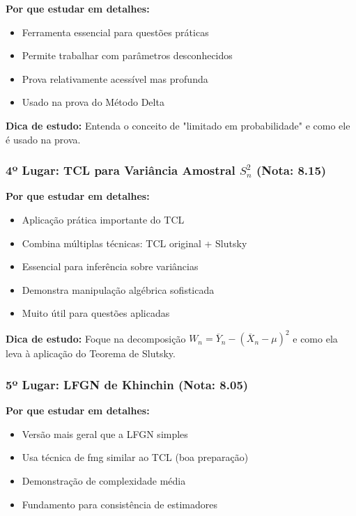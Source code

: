 \documentclass[12pt,a4paper]{article}
\theoremstyle{plain}
\theoremstyle{definition}
\theoremstyle{remark}
\begin{document}
\textbf{Por que estudar em detalhes:}
\begin{itemize}
    \item Ferramenta essencial para questões práticas
    \item Permite trabalhar com parâmetros desconhecidos
    \item Prova relativamente acessível mas profunda
    \item Usado na prova do Método Delta
\end{itemize}

\textbf{Dica de estudo:} Entenda o conceito de "limitado em probabilidade" e como ele é usado na prova.

\subsubsection{4º Lugar: TCL para Variância Amostral $S_n^2$ (Nota: 8.15)}

\textbf{Por que estudar em detalhes:}
\begin{itemize}
    \item Aplicação prática importante do TCL
    \item Combina múltiplas técnicas: TCL original + Slutsky
    \item Essencial para inferência sobre variâncias
    \item Demonstra manipulação algébrica sofisticada
    \item Muito útil para questões aplicadas
\end{itemize}

\textbf{Dica de estudo:} Foque na decomposição $W_n = \overline{Y}_n - (\overline{X}_n - \mu)^2$ e como ela leva à aplicação do Teorema de Slutsky.

\subsubsection{5º Lugar: LFGN de Khinchin (Nota: 8.05)}

\textbf{Por que estudar em detalhes:}
\begin{itemize}
    \item Versão mais geral que a LFGN simples
    \item Usa técnica de fmg similar ao TCL (boa preparação)
    \item Demonstração de complexidade média
    \item Fundamento para consistência de estimadores
\end{itemize}
\end{document}
